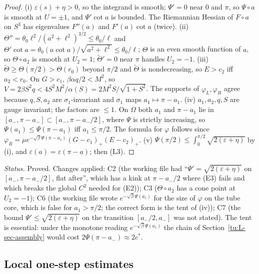 \begin{proof}
(i) $\varepsilon(s)+\eta>0$, so the integrand is smooth; $\Psi'=0$ near $0$ and $\pi$, so $\Psi\circ a$
is smooth at $U=\pm1$, and $\Psi'\cot a$ is bounded. The Riemannian Hessian of $F\circ a$ on $S^3$ has
eigenvalues $F''(a)$ and $F'(a)\cot a$ (twice). (ii) $\Theta''=\theta_0\ell^2/(a^2+\ell^2)^{3/2}\le\theta_0/\ell$
and $\Theta'\cot a=\theta_0(a\cot a)/\sqrt{a^2+\ell^2}\le\theta_0/\ell$; $\Theta$ is an even smooth function of $a$, so
$\Theta\circ a_2$ is smooth at $U_2=1$; $\tilde\Theta'=0$ near $\pi$ handles $U_2=-1$.
(iii) $\tilde\Theta\ge\Theta(\pi/2)>\Theta(r_0)$ beyond $\pi/2$ and $\tilde\Theta$ is nondecreasing, so
$E>c_2$ iff $a_2<r_0$. On $G>c_1$, $\beta\alpha q/2<M^2$, so
$V=2\beta S^2q<4S^2M^2/\alpha(S)=2M^2S/\sqrt{1+S^2}$. The supports of $\varphi_L,\varphi_R$ agree
because $q,S,a_2$ are $\sigma_1$-invariant and $\sigma_1$ maps $a_1\mapsto\pi-a_1$.
(iv) $a_1,a_2,q,S$ are gauge invariant; the factors are $\le1$. On $\Omega$ both $a_1$ and $\pi-a_1$
lie in $[a_-,\pi-a_-]\subset[a_-,\pi-a_-/2]$, where $\Psi$ is strictly increasing, so
$\Psi(a_1)\le\Psi(\pi-a_1)$ iff $a_1\le\pi/2$. The formula for $\varphi$ follows since
$\varphi_R=\mu e^{-\sqrt\beta\Psi(\pi-a_1)}(G-c_1)_+(E-c_2)_+$.
(v) $\Psi(\pi/2)\le\int_0^{\pi/2}\sqrt{2(\varepsilon+\eta)}$ by (i), and $\varepsilon(a)=\varepsilon(\pi-a)$;
then (L3).
\end{proof}

\noindent\emph{Status.} Proved. Changes applied: C2 (the working file had ``$\Psi'=\sqrt{2(\varepsilon+\eta)}$
on $[a_-,\pi-a_-/2]$, flat after'', which has a kink at $\pi-a_-/2$ where (E3) fails and which breaks the
global $C^2$ needed for (E2)); C3 ($\Theta\circ a_2$ has a cone point at $U_2=-1$); C6 (the working file
wrote $e^{-\sqrt\beta\Psi(a_1)}$ for the size of $\varphi$ on the tube core, which is false for
$a_1>\pi/2$; the correct form is the tent of (iv)); C7 (the bound $\Psi'\le\sqrt{2(\varepsilon+\eta)}$
on the transition $[a_-/2,a_-]$ was not stated). The tent is essential: under the monotone reading
$e^{-\sqrt\beta\Psi(a_1)}$ the chain of Section~\ref{tu:L-sec-assembly} would cost $2\Psi(\pi-a_-)\approx2c^*$.

\subsection{Local one-step estimates}

